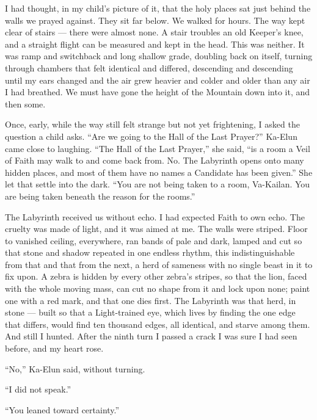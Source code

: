 I had thought, in my child's picture of it, that the holy places sat just behind the walls we prayed against. They sit far below. We walked for hours. The way kept clear of stairs --- there were almost none. A stair troubles an old Keeper's knee, and a straight flight can be measured and kept in the head. This was neither. It was ramp and switchback and long shallow grade, doubling back on itself, turning through chambers that felt identical and differed, descending and descending until my ears changed and the air grew heavier and colder and older than any air I had breathed. We must have gone the height of the Mountain down into it, and then some.\par
 
Once, early, while the way still felt strange but not yet frightening, I asked the question a child asks. ``Are we going to the Hall of the Last Prayer?'' Ka-Elun came close to laughing. ``The Hall of the Last Prayer,'' she said, ``is a room a Veil of Faith may walk to and come back from. No. The Labyrinth opens onto many hidden places, and most of them have no names a Candidate has been given.'' She let that settle into the dark. ``You are not being taken to a room, Va-Kailan. You are being taken beneath the reason for the rooms.''\par
 
The Labyrinth received us without echo. I had expected Faith to own echo. The cruelty was made of light, and it was aimed at me. The walls were striped. Floor to vanished ceiling, everywhere, ran bands of pale and dark, lamped and cut so that stone and shadow repeated in one endless rhythm, this indistinguishable from that and that from the next, a herd of sameness with no single beast in it to fix upon. A zebra is hidden by every other zebra's stripes, so that the lion, faced with the whole moving mass, can cut no shape from it and lock upon none; paint one with a red mark, and that one dies first. The Labyrinth was that herd, in stone --- built so that a Light-trained eye, which lives by finding the one edge that differs, would find ten thousand edges, all identical, and starve among them. And still I hunted. After the ninth turn I passed a crack I was sure I had seen before, and my heart rose.\par
 
``No,'' Ka-Elun said, without turning.\par
 
``I did not speak.''\par
 
``You leaned toward certainty.''\par
 
